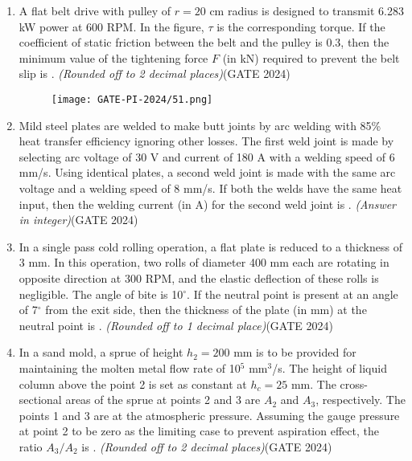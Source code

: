 \documentclass[journal,12pt,onecolumn]{IEEEtran}
\theoremstyle{remark}
\begin{document}
\begin{enumerate}
\item A flat belt drive with pulley of $r = 20$ cm radius is designed to transmit 6.283 kW power at 600 RPM. In the figure, $\tau$ is the corresponding torque. If the coefficient of static friction between the belt and the pulley is 0.3, then the minimum value of the tightening force $F$ (in kN) required to prevent the belt slip is \underline{\hspace{2cm}}. \textit{(Rounded off to 2 decimal places)}\hfill{(GATE 2024)}

\begin{figure}[H]
    \centering
    \texttt{[image: GATE-PI-2024/51.png]}
    \caption{}
    \label{fig:beltdrive}
\end{figure}
\vspace{1cm}

\item Mild steel plates are welded to make butt joints by arc welding with 85\% heat transfer efficiency ignoring other losses. The first weld joint is made by selecting arc voltage of 30 V and current of 180 A with a welding speed of 6 mm/s. Using identical plates, a second weld joint is made with the same arc voltage and a welding speed of 8 mm/s. If both the welds have the same heat input, then the welding current (in A) for the second weld joint is \underline{\hspace{2cm}}. \textit{(Answer in integer)}\hfill{(GATE 2024)}
\vspace{1cm}

\item In a single pass cold rolling operation, a flat plate is reduced to a thickness of 3 mm. In this operation, two rolls of diameter 400 mm each are rotating in opposite direction at 300 RPM, and the elastic deflection of these rolls is negligible. The angle of bite is 10$^\circ$. If the neutral point is present at an angle of 7$^\circ$ from the exit side, then the thickness of the plate (in mm) at the neutral point is \underline{\hspace{2cm}}. \textit{(Rounded off to 1 decimal place)}\hfill{(GATE 2024)}
\vspace{1cm}
\newpage
\item In a sand mold, a sprue of height $h_2 = 200$ mm is to be provided for maintaining the molten metal flow rate of 10$^5$ mm$^3$/s. The height of liquid column above the point 2 is set as constant at $h_c = 25$ mm. The cross-sectional areas of the sprue at points 2 and 3 are $A_2$ and $A_3$, respectively. The points 1 and 3 are at the atmospheric pressure. Assuming the gauge pressure at point 2 to be zero as the limiting case to prevent aspiration effect, the ratio $A_3/A_2$ is \underline{\hspace{2cm}}. \textit{(Rounded off to 2 decimal places)}\hfill{(GATE 2024)}


\end{enumerate}
\end{document}
